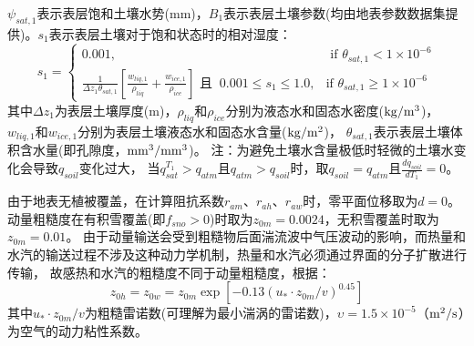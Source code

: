 $\psi_{sat,1}$表示表层饱和土壤水势(mm)，$B_1$表示表层土壤\citep{clapp1978empirical}参数(均由地表参数数据集提供)。$s_1$表示表层土壤对于饱和状态时的相对湿度：
\begin{equation}
s_{1}= \begin{cases}
   0.001, & \text { if } \theta_{sat, 1}<1 \times 10^{-6} \\ 
   \frac{1}{\Delta z_{1} \theta_{sat, 1}}\left[\frac{w_{liq, 1}}{\rho_{liq}}+\frac{w_{ice, 1}}{\rho_{ice}}\right]  \text{ 且  }\  0.001 \leq s_{1} \leq 1.0, &\text {if } \theta_{sat, 1} \geq 1 \times 10^{-6}
   \end{cases}
\end{equation}
其中$\Delta z_{1}$为表层土壤厚度(m)，$\rho_{liq}$和$\rho_{ice}$分别为液态水和固态水密度($\rm kg/m^3$)，
$w_{liq,1}$和$w_{ice,1}$分别为表层土壤液态水和固态水含量($\rm kg/m^2$)，
$\theta_{sat,1}$表示表层土壤体积含水量(即孔隙度，$\rm mm^3/mm^3$)。
注：为避免土壤水含量极低时轻微的土壤水变化会导致$q_{soil}$变化过大，
当$q_{sat}^{T_1}>q_{atm}$且$q_{atm}>q_{soil}$时，取$q_{soil} = q_{atm}$且$\frac{dq_{soil}}{dT_1} = 0$。


由于地表无植被覆盖，在计算阻抗系数$r_{am}$、$r_{ah}$、$r_{aw}$时，零平面位移取为$d=0$。
动量粗糙度在有积雪覆盖(即$f_{sno}>0$)时取为$z_{0m}=0.0024$，无积雪覆盖时取为$z_{0m}=0.01$。
由于动量输送会受到粗糙物后面湍流波中气压波动的影响，而热量和水汽的输送过程不涉及这种动力学机制，热量和水汽必须通过界面的分子扩散进行传输，
故感热和水汽的粗糙度不同于动量粗糙度，根据\citep{zeng1998effect}：
\begin{equation}\label{z0hw}
z_{0 h} = z_{0 w} = z_{0 m} \exp \left[-0.13\left(u_{*} \cdot z_{0 m} / v\right)^{0.45}\right]
\end{equation}
其中$u_{*} \cdot z_{0 m} / v$为粗糙雷诺数(可理解为最小湍涡的雷诺数)，$\upsilon=1.5\times{10}^{-5}$（$\rm m^2/s$）为空气的动力粘性系数。


